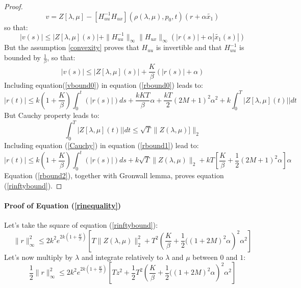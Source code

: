 \documentclass[a4paper,10pt]{article}
\begin{document}
\begin{proof}
\begin{equation}
         v =  Z[\lambda,\mu] 
         -[H_{uu}^{-1}H_{ux}](\rho(\lambda,\mu),p_{0},t)(r+\alpha 
         \tilde{x_{1}}) 
    \label{vexpression}
\end{equation}
   so that:
   \[
     |v(s)|  \leq |Z[\lambda,\mu](s)| + 
     \|H_{uu}^{-1}\|_{\infty}\|H_{ux}\|_{\infty}(|r(s)| + \alpha 
     |\tilde{x_{1}}(s)|)
   \]
   But the assumption \ref{convexity} proves that $H_{uu}$ is 
   invertible and that $H_{uu}^{-1}$ is bounded by $\frac{1}{\beta}$, 
   so that:
   \begin{equation}
       |v(s)|  \leq |Z[\lambda,\mu](s)| + \frac{K}{\beta}(|r(s)| + \alpha)
       \label{vbound0}
   \end{equation}
   Including equation(\ref{vbound0}) in equation (\ref{rbound0}) 
   leads to:
   \begin{equation}
       |r(t)| \leq k \left(1+\frac{K}{\beta}\right)\int_{0}^{t} (|r(s)|)ds + 
      \frac{kKT}{\beta}\alpha + \frac{kT}{2}(2M+1)^{2} \alpha^{2} +
      k\int_{0}^{T} |Z[\lambda,\mu](t)||dt
       \label{rbound1}
   \end{equation}
   But Cauchy property leads to:
   \begin{equation}
       \int_{0}^{T} |Z[\lambda,\mu](t)||dt \leq \sqrt{T}\|Z(\lambda,\mu)]\|_{2}
       \label{Cauchy}
   \end{equation}
   Including equation (\ref{Cauchy}) in equation (\ref{rbound1}) lead 
   to:
   \begin{equation}
       |r(t)| \leq k 
       \left(1+\frac{K}{\beta}\right)\int_{0}^{t} (|r(s)|)ds +
       k\sqrt{T}\|Z(\lambda,\mu)\|_{2} +
      kT\left[\frac{K}{\beta} + \frac{1}{2}(2M+1)^{2} \alpha\right]\alpha
       \label{rbound2}
   \end{equation}
   Equation (\ref{rbound2}), together with Gronwall lemma, proves 
   equation (\ref{rinftybound}).
\end{proof}
\paragraph{Proof of Equation (\ref{rinequality})}

Let's take the square of equation (\ref{rinftybound}):
\[
    \|r\|_{\infty}^{2} \leq 2k^{2}e^{2k\left(1+\frac{K}{\beta}\right)}
	     \left[T\|Z(\lambda,\mu)\|_{2}^{2}
	     +T^{2}\left(\frac{K}{\beta}+\frac{1}{2}((1+2M)^{2} 
	     \alpha\right)^{2} \alpha^{2} \right]
\]
Let's now multiply by $\lambda$ and integrate relatively to $\lambda$ 
and $\mu$ between $0$ and $1$:
\[
    \frac{1}{2}\|r\|_{\infty}^{2} \leq 2k^{2}e^{2k\left(1+\frac{K}{\beta}\right)}
	     \left[Tz^{2} + \frac{1}{2}T^{2}\left(\frac{K}{\beta}+\frac{1}{2}((1+2M)^{2} 
	     \alpha\right)^{2} \alpha^{2} \right]
\]
\end{document}
